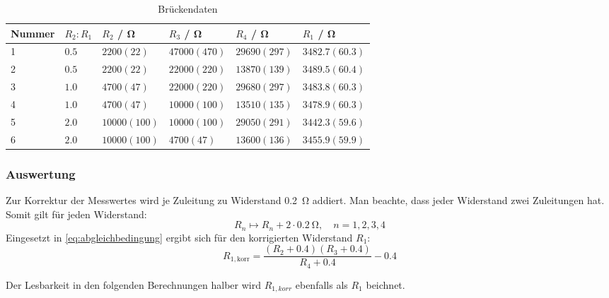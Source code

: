 \begin{table}[h]
	\centering
	\caption{Brückendaten}\label{tab:brueckendaten}
	\begin{tabularx}{\textwidth}{Y|YYYY|Y}
		Nummer & $R_2:R_1$ & $R_2$ / \si{\ohm} & $R_3$ / \si{\ohm} & $R_4$ / \si{\ohm} & $R_1$ / \si{\ohm} \\       & $0.5$     & $2200(22)$        & $47000(470)$      & $29690(297)$      & $3482.7(60.3)$    \\
		2      & $0.5$     & $2200(22)$        & $22000(220)$      & $13870(139)$      & $3489.5(60.4)$    \\
		3      & $1.0$     & $4700(47)$        & $22000(220)$      & $29680(297)$      & $3483.8(60.3)$    \\
		4      & $1.0$     & $4700(47)$        & $10000(100)$      & $13510(135)$      & $3478.9(60.3)$    \\
		5      & $2.0$     & $10000(100)$      & $10000(100)$      & $29050(291)$      & $3442.3(59.6)$    \\
		6      & $2.0$     & $10000(100)$      & $4700(47)$        & $13600(136)$      & $3455.9(59.9)$    \\
	\end{tabularx}
\end{table}

\subsubsection{Auswertung}

Zur Korrektur der Messwertes wird je Zuleitung zu Widerstand \SI{0.2}{\ohm} addiert. Man beachte, dass jeder Widerstand zwei Zuleitungen hat. Somit gilt für jeden Widerstand:
\[
	R_n \mapsto R_n + 2\cdot\SI{0.2}{\ohm}, \quad n=1,2,3,4
\]
Eingesetzt in \autoref{eq:abgleichbedingung} ergibt sich für den korrigierten
Widerstand $R_1$:
\[
	R_{1,\text{korr}} = \frac{(R_2 + 0.4)(R_3 + 0.4)}{R_4 + 0.4} - 0.4
\]

Der Lesbarkeit in den folgenden Berechnungen halber wird $R_{1,korr}$ ebenfalls als $R_1$ beichnet.

